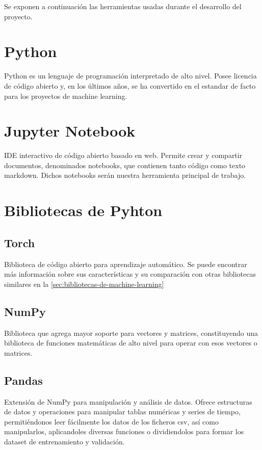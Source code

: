 
Se exponen a continuación las herramientas usadas durante el desarrollo del proyecto.

\section{Python}\label{sec:bibliotecas-de}
Python es un lenguaje de programación interpretado de alto nivel. Posee licencia de código abierto y, en los últimos años, se ha convertido en el estandar de facto para los proyectos de machine learning.

\section{Jupyter Notebook}
IDE interactivo de código abierto basado en web. Permite crear y compartir documentos, denominados notebooks, que contienen tanto código como texto markdown. Dichos notebooks serán nuestra herramienta principal de trabajo. 

\section{Bibliotecas de Pyhton}

\subsection{Torch}
Biblioteca de código abierto para aprendizaje automático. Se puede encontrar más información sobre sus características y su comparación con otras bibliotecas similares en la \autoref{sec:bibliotecas-de-machine-learning} \
 
\subsection{NumPy}
Biblioteca que agrega mayor soporte para vectores y matrices, constituyendo una biblioteca de funciones matemáticas de alto nivel para operar con esos vectores o matrices.

\subsection{Pandas}
Extensión de NumPy para manipulación y análisis de datos. Ofrece estructuras de datos y operaciones para manipular tablas numéricas y series de tiempo, permitiéndonos leer fácilmente los datos de los ficheros csv, así como manipularlos, aplicandoles diversas funciones o dividiendolos para formar los dataset de entrenamiento y validación.

